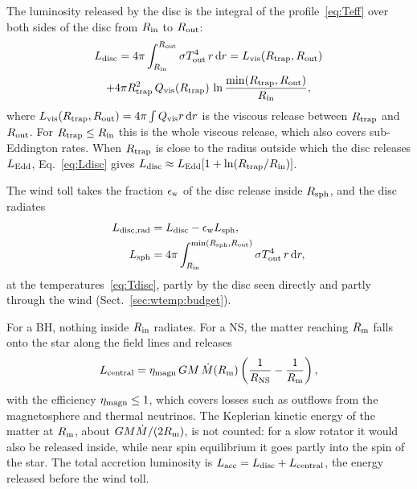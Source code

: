 The luminosity released by the disc is the integral of the profile~\eqref{eq:Teff} over both sides of the disc from $R_{\rm in}$ to $R_{\rm out}$:
\begin{multline}
L_{\rm disc} = 4\pi\int_{R_{\rm in}}^{R_{\rm out}} \sigma T_{\rm out}^4\,r\,{\rm d}r
= L_{\rm vis}(R_{\rm trap}, R_{\rm out}) \\
+ 4\pi R_{\rm trap}^2\,Q_{\rm vis}(R_{\rm trap})\,\ln\frac{\min(R_{\rm trap}, R_{\rm out})}{R_{\rm in}},
\label{eq:Ldisc}
\end{multline}
where $L_{\rm vis}(R_{\rm trap}, R_{\rm out}) = 4\pi\int Q_{\rm vis} r\,{\rm d}r$ is the viscous release between $R_{\rm trap}$ and $R_{\rm out}$.
For $R_{\rm trap} \le R_{\rm in}$ this is the whole viscous release, which also covers sub-Eddington rates.
When $R_{\rm trap}$ is close to the radius outside which the disc releases $L_{\rm Edd}$, Eq.~\eqref{eq:Ldisc} gives $L_{\rm disc} \approx L_{\rm Edd}[1 + \ln(R_{\rm trap}/R_{\rm in})]$.

The wind toll takes the fraction $\epsilon_{\rm w}$  of the disc release inside $R_{\rm sph}$, and the disc radiates
\begin{equation}
\begin{split}
L_{\rm disc,rad} &= L_{\rm disc} - \epsilon_{\rm w}L_{\rm sph}, \\
L_{\rm sph} &= 4\pi\int_{R_{\rm in}}^{\min(R_{\rm sph}, R_{\rm out})} \sigma T_{\rm out}^4\,r\,{\rm d}r ,
\end{split}
\label{eq:Ldisc_rad}
\end{equation}
at the temperatures~\eqref{eq:Tdisc}, partly by the disc seen directly and partly through the wind (Sect.~\ref{sec:wtemp:budget}).

For a BH, nothing inside $R_{\rm in}$ radiates.
For a NS, the matter reaching $R_{\rm m}$ falls onto the star along the field lines and releases
\begin{equation}
L_{\rm central} = \eta_{\rm magn}\,G M\,\dot M(R_{\rm m})\left(\frac{1}{R_{\rm NS}} - \frac{1}{R_{\rm m}}\right),
\label{eq:Lcentral}
\end{equation}
with the efficiency $\eta_{\rm magn} \le 1$, which covers losses such as outflows from the magnetosphere and  thermal neutrinos.
The Keplerian kinetic energy of the matter at $R_{\rm m}$, about $GM\dot M/(2R_{\rm m})$, is not counted: for a slow rotator it would also be released inside, while near spin equilibrium it goes partly into the spin of the star.
The total accretion luminosity is $L_{\rm acc} = L_{\rm disc} + L_{\rm central}$, the energy released before the wind toll.
